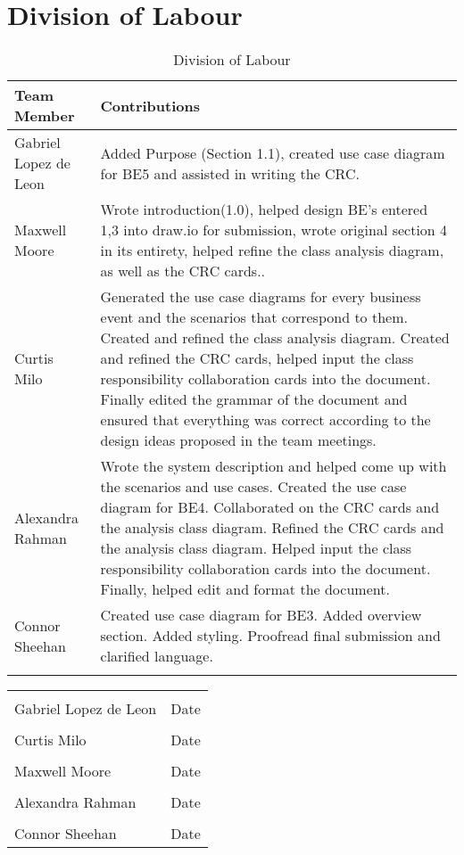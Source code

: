 \documentclass[titlepage]{article}
\begin{document}
\section{Division of Labour}
\label{sec:division_of_labour}
\begin{longtable}{| p{} | p{} |}
			\hline
			\textbf {Team Member} & \textbf{Contributions}\\ 
			\hline
			Gabriel Lopez de Leon &  Added Purpose (Section 1.1), created use case diagram for BE5 and assisted in writing the CRC.
			\\
			\hline
			Maxwell Moore & Wrote introduction(1.0), helped design BE's entered 1,3 into draw.io for submission, wrote original section 4 in its entirety, helped refine the class analysis diagram, as well as the CRC cards..
			\\
			\hline
			Curtis Milo & Generated the use case diagrams for every business event and the scenarios that correspond to them. Created and refined the class analysis diagram. Created and refined the CRC cards, helped input the class responsibility collaboration cards into the document. Finally edited the grammar of the document and ensured that everything was correct according to the design ideas proposed in the team meetings.
			\\ 
			\hline
			Alexandra Rahman & Wrote the system description and helped come up with the scenarios and use cases. Created the use case diagram for BE4. Collaborated on the CRC cards and the analysis class diagram. Refined the CRC cards and the analysis class diagram. Helped input the class responsibility collaboration cards into the document. Finally, helped edit and format the document.
			\\
			\hline
			Connor Sheehan & Created use case diagram for BE3. Added overview section. Added styling. Proofread final submission and clarified language.\\
			\hline
			
			\caption{Division of Labour}
		\end{longtable}



\noindent\begin{tabular}{ll}\\
	\makebox[2.5in]{\hrulefill} & \makebox[2.5in]			{\hrulefill}\\
	Gabriel Lopez de Leon & Date\\[8ex]%
	\makebox[2.5in]{\hrulefill} & \makebox[2.5in]			{\hrulefill}\\
	Curtis Milo & Date\\[8ex]
	\makebox[2.5in]{\hrulefill} & \makebox[2.5in]			{\hrulefill}\\
	Maxwell Moore & Date\\[8ex]
	\makebox[2.5in]{\hrulefill} & \makebox[2.5in]			{\hrulefill}\\
	Alexandra Rahman & Date\\[8ex]
	\makebox[2.5in]{\hrulefill} & \makebox[2.5in]			{\hrulefill}\\
	Connor Sheehan & Date\\
	\end{tabular}
\end{document}
